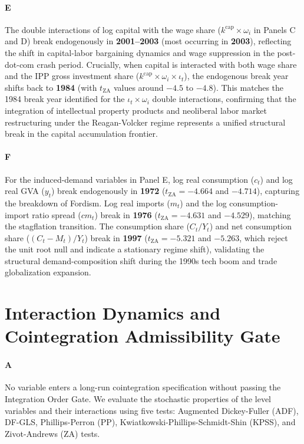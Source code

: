 \documentclass[11pt,a4paper]{article}
\begin{document}
\paragraph{E}
The double interactions of log capital with the wage share ($k^{\text{cap}} \times \omega_i$ in Panels C and D) break endogenously in \textbf{2001--2003} (most occurring in \textbf{2003}), reflecting the shift in capital-labor bargaining dynamics and wage suppression in the post-dot-com crash period. Crucially, when capital is interacted with both wage share and the IPP gross investment share ($k^{\text{cap}} \times \omega_i \times \iota_t$), the endogenous break year shifts back to \textbf{1984} (with $t_{\text{ZA}}$ values around $-4.5$ to $-4.8$). This matches the 1984 break year identified for the $\iota_t \times \omega_i$ double interactions, confirming that the integration of intellectual property products and neoliberal labor market restructuring under the Reagan-Volcker regime represents a unified structural break in the capital accumulation frontier.

\paragraph{F}
For the induced-demand variables in Panel E, log real consumption ($c_t$) and log real GVA ($y_t$) break endogenously in \textbf{1972} ($t_{\text{ZA}} = -4.664$ and $-4.714$), capturing the breakdown of Fordism. Log real imports ($m_t$) and the log consumption-import ratio spread ($cm_t$) break in \textbf{1976} ($t_{\text{ZA}} = -4.631$ and $-4.529$), matching the stagflation transition. The consumption share ($C_t/Y_t$) and net consumption share ($(C_t - M_t)/Y_t$) break in \textbf{1997} ($t_{\text{ZA}} = -5.321$ and $-5.263$, which reject the unit root null and indicate a stationary regime shift), validating the structural demand-composition shift during the 1990s tech boom and trade globalization expansion.

\FloatBarrier
\section{Interaction Dynamics and Cointegration Admissibility Gate}

\paragraph{A}
No variable enters a long-run cointegration specification without passing the Integration Order Gate. We evaluate the stochastic properties of the level variables and their interactions using five tests: Augmented Dickey-Fuller (ADF), DF-GLS, Phillips-Perron (PP), Kwiatkowski-Phillips-Schmidt-Shin (KPSS), and Zivot-Andrews (ZA) tests.
\end{document}
